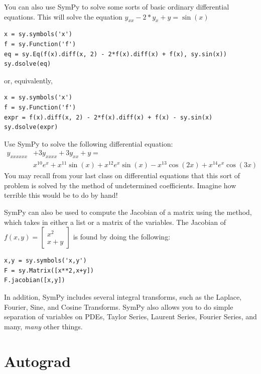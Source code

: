 You can also use SymPy to solve some sorts of basic ordinary differential equations.
This will solve the equation $y_{xx}-2*y_x+y=\sin\left(x\right)$
\begin{lstlisting}
x = sy.symbols('x')
f = sy.Function('f')
eq = sy.Eq(f(x).diff(x, 2) - 2*f(x).diff(x) + f(x), sy.sin(x))
sy.dsolve(eq)
\end{lstlisting}
or, equivalently,
\begin{lstlisting}
x = sy.symbols('x')
f = sy.Function('f')
expr = f(x).diff(x, 2) - 2*f(x).diff(x) + f(x) - sy.sin(x)
sy.dsolve(expr)
\end{lstlisting}
\begin{problem}
Use SymPy to solve the following differential equation:
\begin{equation*}
\begin{split}
 y_{xxxxxx} & + 3y_{xxxx} + 3y_{xx} + y = \\
& x^{10}e^x + x^{11}\sin\left(x\right) + x^{12}e^x\sin\left(x\right) -x^{13}\cos\left(2x\right) + x^{14}e^x\cos\left(3x\right)
\end{split}
\end{equation*}
You may recall from your last class on differential equations that this sort of problem is solved by the method of undetermined coefficients.
Imagine how terrible this would be to do by hand!
\end{problem}

SymPy can also be used to compute the Jacobian of a matrix using the  method, which takes in either a list or a matrix of the variables.  The Jacobian of $f(x,y) = \left[\begin{array}{c} x^2 \\ x+y \end{array}\right]$ is found by doing the following:
\begin{lstlisting}
x,y = sy.symbols('x,y')
F = sy.Matrix([x**2,x+y])
F.jacobian([x,y])
\end{lstlisting}

In addition, SymPy includes several integral transforms, such as the Laplace, Fourier, Sine, and Cosine Transforms.
SymPy also allows you to do simple separation of variables on PDEs, Taylor Series, Laurent Series, Fourier Series, and many, \textit{many} other things.

\section*{Autograd}

